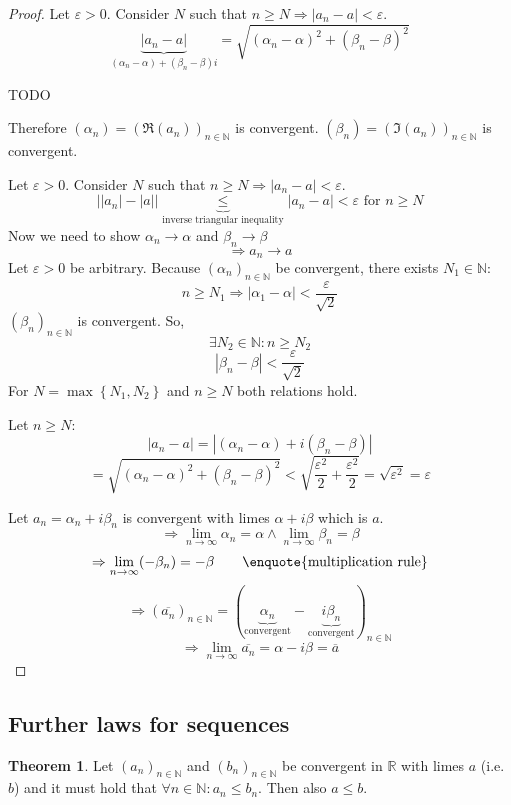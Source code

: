 \documentclass[a4paper,landscape,twocolumn]{article}
\theoremstyle{definition}
\newtheorem{theorem}{Theorem}
\newcommand\set[1]{\left\{#1\right\}}
\newcommand\abs[1]{\left|#1\right|}
\newcommand\seq[1]{{\left(#1\right)}_{n \in \mathbb N}}
\begin{document}
\begin{proof}
  Let $\varepsilon > 0$. Consider $N$ such that $n \geq N \Rightarrow \abs{a_n - a} < \varepsilon$.
  \[ \underbrace{\abs{a_n - a}}_{(\alpha_n - \alpha) + (\beta_n - \beta)i} = \sqrt{(\alpha_n - \alpha)^2 + (\beta_n - \beta)^2} \]

  TODO

  Therefore $(\alpha_n) = \seq{\Re(a_n)}$ is convergent.
  $(\beta_n) = \seq{\Im(a_n)}$ is convergent.

  Let $\varepsilon > 0$. Consider $N$ such that $n \geq N \Rightarrow \abs{a_n - a} < \varepsilon$.
  \[
      \abs{\abs{a_n} - \abs{a}}
      \underbrace{\leq}_{\text{inverse triangular inequality}}
      \abs{a_n - a} < \varepsilon \text{ for } n \geq N
  \]
  Now we need to show $\alpha_n \rightarrow \alpha$ and $\beta_n \rightarrow \beta$
  \[ \Rightarrow a_n \rightarrow a \]
  Let $\varepsilon > 0$ be arbitrary.
  Because $\seq{\alpha_n}$ be convergent, there exists $N_1 \in \mathbb N$:
  \[ n \geq N_1 \Rightarrow \abs{\alpha_1 - \alpha} < \frac{\varepsilon}{\sqrt{2}} \]
  $\seq{\beta_n}$ is convergent. So,
  \[ \exists N_2 \in \mathbb N: n \geq N_2 \]
  \[ \abs{\beta_n - \beta} < \frac{\varepsilon}{\sqrt{2}} \]
  For $N = \max\set{N_1, N_2}$ and $n \geq N$ both relations hold.

  Let $n \geq N$:
  \[ \abs{a_n - a} = \abs{(\alpha_n - \alpha) + i (\beta_n - \beta)} \]
  \[
      = \sqrt{(\alpha_n - \alpha)^2 + (\beta_n - \beta)^2}
      < \sqrt{\frac{\varepsilon^2}{2} + \frac{\varepsilon^2}{2}}
      = \sqrt{\varepsilon^2} = \varepsilon
  \]

  Let $a_n = \alpha_n + i \beta_n$ is convergent with limes $\alpha + i \beta$ which is $a$.
  \[ \Rightarrow \lim_{n \to \infty} \alpha_n = \alpha \land \lim_{n \to \infty} \beta_n = \beta \]
  \[ \Rightarrow \lim_{n \to \infty} (-\beta_n) = -\beta \qquad\text{\enquote{multiplication rule}} \]
  \[ \Rightarrow (\overline{a_n})_{n \in \mathbb N} = (\underbrace{\alpha_n}_{\text{convergent}} - \underbrace{i \beta_n}_{\text{convergent}})_{n \in \mathbb N} \]
  \[ \Rightarrow \lim_{n \to \infty} \overline{a_n} = \alpha - i \beta = \overline{a} \]
\end{proof}

\subsection{Further laws for sequences}
%
\begin{theorem}
  Let $\seq{a_n}$ and $\seq{b_n}$ be convergent in $\mathbb R$ with limes $a$ (i.e. $b$)
  and it must hold that $\forall n \in \mathbb N: a_n \leq b_n$. Then also $a \leq b$.
\end{theorem}
\end{document}

